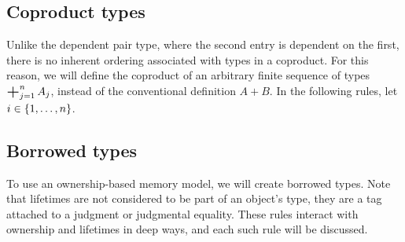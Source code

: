 \documentclass[11pt]{book}
\DeclareMathOperator*{\bigplus}{\scalerel*{+}{\textstyle\sum}}
\begin{document}
\subsection{Coproduct types}

Unlike the dependent pair type, where the second entry is dependent on the first, there is no inherent ordering associated with types in a coproduct.
For this reason, we will define the coproduct of an arbitrary finite sequence of types \( \bigplus_{j=1}^n A_j \), instead of the conventional definition \( A + B \).
In the following rules, let \( i \in \qty{1, \dots, n} \).

\subsection{Borrowed types}

To use an ownership-based memory model, we will create borrowed types.
Note that lifetimes are not considered to be part of an object's type, they are a tag attached to a judgment or judgmental equality.
These rules interact with ownership and lifetimes in deep ways, and each such rule will be discussed.
\end{document}
